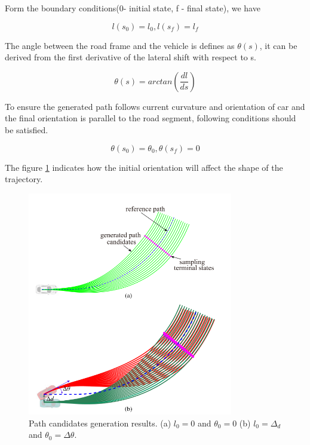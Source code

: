 Form the boundary conditions(0- initial state, f - final state), we have

\begin{equation}
l(s_0) = l_0 , l(s_f ) = l_f
\label{lat_boudary}
\end{equation}

The angle between the road frame and the vehicle is defines as $\theta(s)$, it can be derived from the first derivative of the lateral shift with respect to s. 

\begin{equation}
\theta(s) = arctan(\frac{dl}{ds})
\label{lat_veh_theta}
\end{equation}

To ensure the generated path follows current curvature and orientation of car and the final orientation is parallel to the road segment, following conditions should be satisfied.


\begin{equation}
\theta(s_0) = \theta_0 , \theta(s_f) = 0
\label{th_bundary}
\end{equation}

The figure \ref{lat_planning} indicates how the initial orientation will affect the shape of the trajectory. 

 \begin{figure}[H]
    \centering
    \includegraphics[width=0.8\textwidth]{Images/lateral_planning.png}
    \caption{Path candidates generation results. (a) $l_0 = 0$ and $\theta_0 = 0$ (b) $ 
l_0 = \Delta_d$ and $ \theta_0 = \Delta\theta$.}
    \label{lat_planning}
\end{figure}

